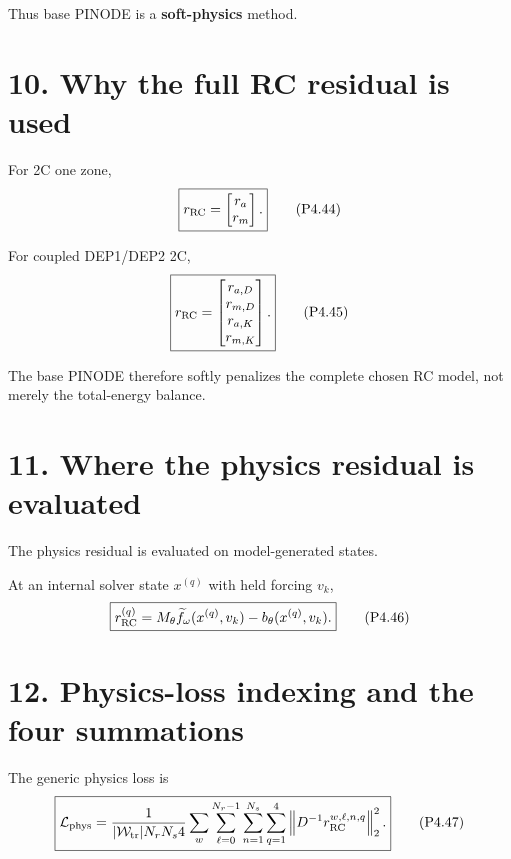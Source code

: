 \documentclass[11pt]{article}
\begin{document}
Thus base PINODE is a \textbf{soft-physics} method.

\section*{10. Why the full RC residual is used}

For 2C one zone,
\begin{align}
\boxed{
r_{\rm RC}
=
\begin{bmatrix}
r_a\\
r_m
\end{bmatrix}.
}
\tag{P4.44}
\end{align}

For coupled DEP1/DEP2 2C,
\begin{align}
\boxed{
r_{\rm RC}
=
\begin{bmatrix}
r_{a,D}\\
r_{m,D}\\
r_{a,K}\\
r_{m,K}
\end{bmatrix}.
}
\tag{P4.45}
\end{align}

The base PINODE therefore softly penalizes the complete chosen RC model, not merely the total-energy balance.

\section*{11. Where the physics residual is evaluated}

The physics residual is evaluated on model-generated states.

At an internal solver state \(x^{(q)}\) with held forcing \(v_k\),
\begin{align}
\boxed{
r_{\rm RC}^{(q)}
=
M_\theta
\widetilde f_\omega(x^{(q)},v_k)
-
b_\theta(x^{(q)},v_k).
}
\tag{P4.46}
\end{align}

\section*{12. Physics-loss indexing and the four summations}

The generic physics loss is
\begin{align}
\boxed{
\mathcal L_{\rm phys}
=
\frac{1}
{
|\mathcal W_{\rm tr}|N_rN_s4
}
\sum_w
\sum_{\ell=0}^{N_r-1}
\sum_{n=1}^{N_s}
\sum_{q=1}^{4}
\left\|
D^{-1}
r_{\rm RC}^{w,\ell,n,q}
\right\|_2^2.
}
\tag{P4.47}
\end{align}
\end{document}
